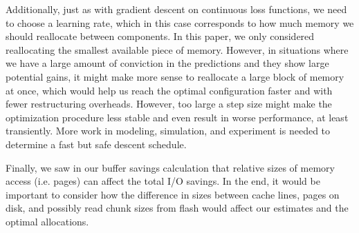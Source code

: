 \documentclass{sig-alternate-05-2015}
\begin{document}
Additionally, just as with gradient descent on continuous loss functions, we
need to choose a learning rate, which in this case corresponds to how much
memory we should reallocate between components. In this paper, we only
considered reallocating the smallest available piece of memory. However, in
situations where we have a large amount of conviction in the predictions and
they show large potential gains, it might make more sense to reallocate a large
block of memory at once, which would help us reach the optimal configuration
faster and with fewer restructuring overheads. However, too large a step size
might make the optimization procedure less stable and even result in worse
performance, at least transiently. More work in modeling, simulation, and
experiment is needed to determine a fast but safe descent schedule.

Finally, we saw in our buffer savings calculation that relative sizes of memory
access (i.e. pages) can affect the total I/O savings. In the end, it would be
important to consider how the difference in sizes between cache lines, pages on
disk, and possibly read chunk sizes from flash would affect our estimates and
the optimal allocations.


\small

\end{document}
